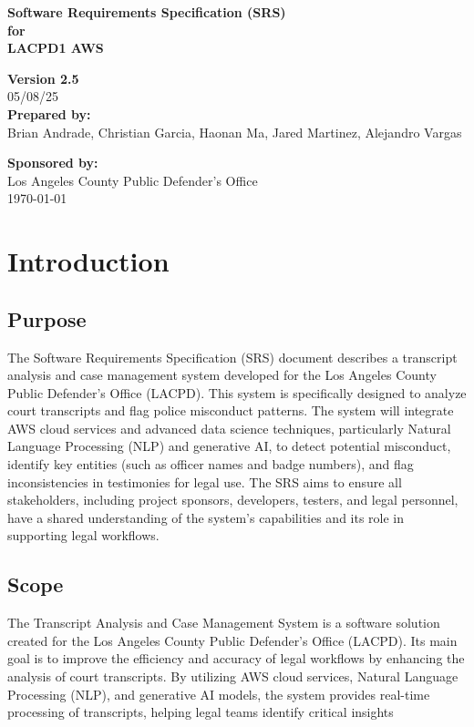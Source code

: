 \documentclass[12pt]{article}
\begin{document}
\begin{titlepage}
    \centering
    \vspace*{2cm}

    {\Huge\bfseries Software Requirements Specification (SRS)\\
    for\\
    LACPD1 AWS\\}

    \textbf{Version 2.5}\\
    05/08/25\\

    \textbf{Prepared by:}\\
    Brian Andrade, Christian Garcia, Haonan Ma, Jared Martinez, Alejandro Vargas

    \textbf{Sponsored by:}\\
    Los Angeles County Public Defender's Office\\

    \vfill
    {\large \today}
\end{titlepage}

\tableofcontents
\setcounter{tocdepth}{3}  


\newpage

\section{Introduction}
\subsection{Purpose}
The Software Requirements Specification (SRS) document describes a transcript analysis
 and case management system developed for the Los Angeles County Public Defender’s Office
 (LACPD). This system is specifically designed to analyze court transcripts and flag police
 misconduct patterns. The system will integrate AWS cloud services and advanced data science
 techniques, particularly Natural Language Processing (NLP) and generative AI, to detect
 potential misconduct, identify key entities (such as officer names and badge numbers), and flag
 inconsistencies in testimonies for legal use.
 The SRS aims to ensure all stakeholders, including project sponsors, developers, testers,
 and legal personnel, have a shared understanding of the system’s capabilities and its role in
 supporting legal workflows.


\subsection{Scope}
 The Transcript Analysis and Case Management System is a software solution created for
 the Los Angeles County Public Defender’s Office (LACPD). Its main goal is to improve the
 efficiency and accuracy of legal workflows by enhancing the analysis of court transcripts. By
 utilizing AWS cloud services, Natural Language Processing (NLP), and generative AI models,
 the system provides real-time processing of transcripts, helping legal teams identify critical
 insights
\end{document}
